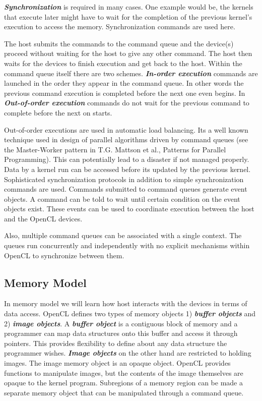 \textit{\textbf{Synchronization}} is required in many cases. One example would be, the kernels that execute later might have to wait for the completion of the previous kernel's execution to access the memory. Synchronization commands are used here.

The host submits the commands to the command queue and the device(s) proceed without waiting for the host to give any other command. The host then waits for the devices to finish execution and get back to the host. Within the command queue itself there are two schemes. \textit{\textbf{In-order execution}} commands are launched in the order they appear in the command queue. In other words the previous command execution is completed before the next one even begins. In \textit{\textbf{Out-of-order execution}} commands do not wait for the previous command to complete before the next on starts.

Out-of-order executions are used in automatic load balancing. Its a well known technique used in design of parallel algorithms driven by command queues (see the Master-Worker pattern in T.G. Mattson et al., Patterns for Parallel Programming). This can potentially lead to a disaster if not managed properly. Data by a kernel run can be accessed before its updated by the previous kernel. Sophisticated synchronization protocols in addition to simple synchronization commands are used. Commands submitted to command queues generate event objects. A command can be told to wait until certain condition on the event objects exist. These events can be used to coordinate execution between the host and the OpenCL devices. 

Also, multiple command queues can be associated with a single context. The queues run concurrently and independently with no explicit mechanisms within OpenCL to synchronize between them.

\subsection{Memory Model}
In memory model we will learn how host interacts with the devices in terms of data access. OpenCL defines two types of memory objects 1) \textit{\textbf{buffer objects}} and 2) \textit{\textbf{image objects}}. A \textit{\textbf{buffer object}} is a contiguous block of memory and a programmer can map data structures onto this buffer and access it through pointers. This provides flexibility to define about any data structure the programmer wishes. \textit{\textbf{Image objects}} on the other hand are restricted to holding images. The image memory object is an opaque object. OpenCL provides functions to manipulate images, but the contents of the image themselves are opaque to the kernel program. Subregions of a memory region can be made a separate memory object that can be manipulated through a command queue.

